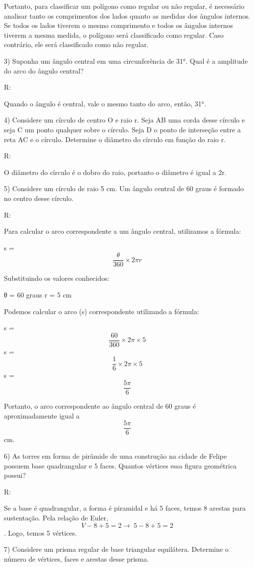 Portanto, para classificar um polígono como regular ou não regular, é
necessário analisar tanto os comprimentos dos lados quanto as medidas
dos ângulos internos. Se todos os lados tiverem o mesmo comprimento e
todos os ângulos internos tiverem a mesma medida, o polígono será
classificado como regular. Caso contrário, ele será classificado como
não regular.

3) Suponha um ângulo central em uma circunferência de 31°. Qual é a
amplitude do arco do ângulo central?

R:

Quando o ângulo é central, vale o mesmo tanto do arco, então, 31°.

4) Considere um círculo de centro O e raio r. Seja AB uma corda desse
círculo e seja C um ponto qualquer sobre o círculo. Seja D o ponto de
interseção entre a reta AC e o círculo. Determine o diâmetro do círculo
em função do raio r.

R:

O diâmetro do círculo é o dobro do raio, portanto o diâmetro é igual a
2r.

5) Considere um círculo de raio 5 cm. Um ângulo central de 60 graus é
formado no centro desse círculo.

R:

Para calcular o arco correspondente a um ângulo central, utilizamos a
fórmula:

s = \[\frac {θ}{360} \times 2πr\]

Substituindo os valores conhecidos:

θ = 60 graus r = 5 cm

Podemos calcular o arco (s) correspondente utilizando a fórmula:

s = \[\frac {60}{360} \times 2π \times 5\] s =
\[\frac {1}{6} \times 2π \times 5\] s = \[\frac {5π}{6}\]

Portanto, o arco correspondente ao ângulo central de 60 graus é
aproximadamente igual a \[\frac {5π}{6}\] cm.

6) As torres em forma de pirâmide de uma construção na cidade de Felipe
possuem base quadrangular e 5 faces. Quantos vértices essa figura
geométrica possui?

R:

Se a base é quadrangular, a forma é piramidal e há 5 faces, temos 8
arestas para sustentação. Pela relação de Euler,
\[V - 8 + 5 = 2 \rightarrow \ 5 - 8 + 5 = 2\] . Logo, temos 5 vértices.

7) Considere um prisma regular de base triangular equilátera. Determine
o número de vértices, faces e arestas desse prisma.

